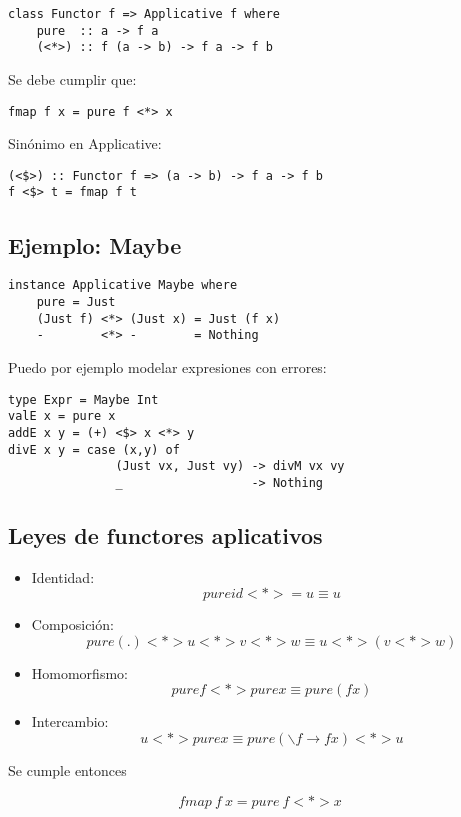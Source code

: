 \documentclass{article}
\newcommand{\imp}[1]{\textcolor{color1}{#1}}
\begin{document}
\begin{itemize}
\begin{lstlisting}
class Functor f => Applicative f where
    pure  :: a -> f a
    (<*>) :: f (a -> b) -> f a -> f b
\end{lstlisting}

Se debe cumplir que:

\begin{lstlisting}
fmap f x = pure f <*> x
\end{lstlisting}

Sinónimo en \imp{Applicative}:

\begin{lstlisting}
(<$>) :: Functor f => (a -> b) -> f a -> f b
f <$> t = fmap f t
\end{lstlisting}

\subsection{Ejemplo: Maybe}

\begin{lstlisting}
instance Applicative Maybe where
    pure = Just
    (Just f) <*> (Just x) = Just (f x)
    -        <*> -        = Nothing
\end{lstlisting}

Puedo por ejemplo modelar expresiones con errores:

\begin{lstlisting}
type Expr = Maybe Int
valE x = pure x
addE x y = (+) <$> x <*> y
divE x y = case (x,y) of
               (Just vx, Just vy) -> divM vx vy
               _                  -> Nothing
\end{lstlisting}

\subsection{Leyes de functores aplicativos}

\begin{itemize}
\item Identidad:
\[pure id <*> = u \equiv u\]
\item Composición:
\[pure (.) <*> u <*> v <*> w \equiv u <*> ( v <*> w)\]
\item Homomorfismo:
\[pure f <*> pure x \equiv pure (f x)\]
\item Intercambio:
\[u <*> pure x \equiv pure (\backslash f \rightarrow f x) <*> u\]
\end{itemize}

Se cumple entonces

\[fmap~f~x = pure~f <*> x\]

\end{itemize}
\end{document}
